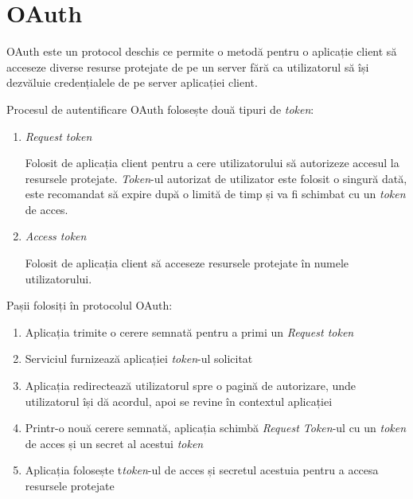 \section{OAuth}
 OAuth este un protocol deschis ce permite o metodă pentru o aplicație  client să acceseze diverse resurse protejate de pe un server fără ca utilizatorul să își dezvăluie credențialele de pe server aplicației client.\cite{RFC5849}
 
 Procesul de autentificare OAuth folosește două tipuri de \textit{token}\cite{oauth-core-revision}:
 \begin{enumerate}
     \item \textit{Request token}
     
     Folosit de aplicația client pentru a cere utilizatorului să autorizeze accesul la resursele protejate. \textit{Token}-ul autorizat de utilizator este folosit o singură dată, este recomandat să expire după o limită de timp și va fi schimbat cu un \textit{token} de acces.
     \item \textit{Access token}
     
     Folosit de aplicația client să acceseze resursele protejate în numele utilizatorului. 
 \end{enumerate}{}
 
 Pașii folosiți în protocolul OAuth:
 \begin{enumerate}
     \item Aplicația trimite o cerere semnată pentru a primi un \textit{Request token}
     \item Serviciul furnizează aplicației \textit{token}-ul solicitat
     \item Aplicația redirectează utilizatorul spre o pagină de autorizare, unde utilizatorul își dă acordul, apoi se revine în contextul aplicației
     \item Printr-o nouă cerere semnată, aplicația schimbă \textit{Request Token}-ul cu un \textit{token} de acces și un secret al acestui \textit{token}
     \item Aplicația folosește t\textit{token}-ul de acces și secretul acestuia pentru a accesa resursele protejate
 \end{enumerate}{}
 

